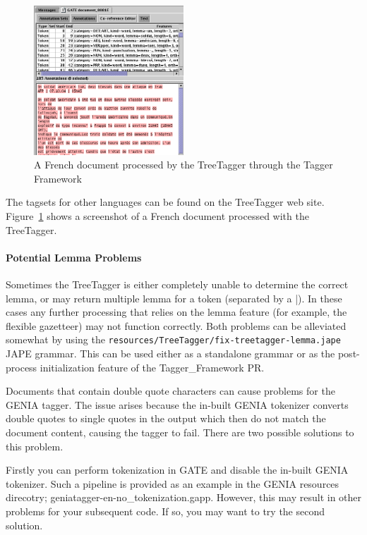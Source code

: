 \begin{figure}[htb]
  \centering
  \includegraphics[width=0.5\textwidth]{treetaggertokens.png}
  \caption{A French document processed by the TreeTagger through the Tagger Framework}
  \label{fig:treetagger}
\end{figure}

The tagsets for other languages can be found on the TreeTagger web
site. Figure~\ref{fig:treetagger} shows a screenshot of a French
document processed with the TreeTagger.

\paragraph{Potential Lemma Problems} Sometimes the TreeTagger is either
completely unable to determine the correct lemma, or may return multiple
lemma for a token (separated by a |). In these cases any further processing
that relies on the lemma feature (for example, the flexible gazetteer) may
not function correctly. Both problems can be alleviated somewhat by using
the \verb|resources/TreeTagger/fix-treetagger-lemma.jape| JAPE grammar.
This can be used either as a standalone grammar or as the post-process
initialization feature of the Tagger\_Framework PR.

Documents that contain double quote characters can cause problems for 
the GENIA tagger. The issue arises because the in-built GENIA tokenizer
converts double quotes to single quotes in the output which then do not
match the document content, causing the tagger to fail. There are two possible
solutions to this problem.

Firstly you can perform tokenization in GATE and disable the in-built 
GENIA tokenizer. Such a pipeline is provided as an example in the GENIA
resources direcotry; geniatagger-en-no\_tokenization.gapp. However, this may
result in other problems for your subsequent code. If so, you may want to
try the second solution. 

